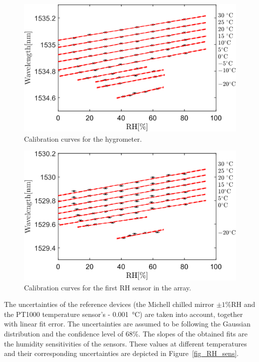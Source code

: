 \begin{figure}[!h]
\centering
\includegraphics[width=0.67\columnwidth]{Chapter5/images/RHS.png}
\caption{Calibration curves for the hygrometer.}
\label{fig_single_calibration}
\end{figure}

\begin{figure}[!h]
\centering
\includegraphics[width=0.67\columnwidth]{Chapter5/images/RH1.png}
\caption{Calibration curves for the first \gls{RH} sensor in the array.}
\label{fig_array_calibration}
\end{figure}
The uncertainties of the reference devices (the Michell chilled mirror $\pm 1$\%RH and the PT1000 temperature sensor's - \SI{0.001}{\celsius}) are taken into account, together with linear fit error. The uncertainties are assumed to be following the Gaussian distribution and the confidence level of 68\%. The slopes of the obtained fits are the humidity sensitivities of the sensors. These values at different temperatures and their corresponding uncertainties are depicted in Figure~\ref{fig_RH_sens}. 

